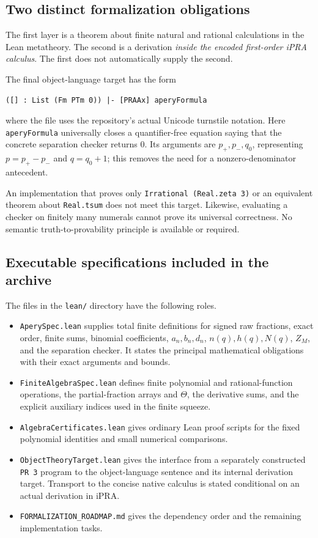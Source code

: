 \documentclass[11pt]{article}
\theoremstyle{definition}\newtheorem{definition}[theorem]{Definition}
\theoremstyle{remark}\newtheorem{remark}[theorem]{Remark}
\newcommand{\code}[1]{{\small\texttt{#1}}}
\begin{document}
\subsection{Two distinct formalization obligations}
The first layer is a theorem about finite natural and rational calculations
in the Lean metatheory. The second is a derivation \emph{inside the encoded
first-order iPRA calculus}. The first does not automatically supply the
second.

The final object-language target has the form
\begin{lstlisting}
([] : List (Fm PTm 0)) |- [PRAAx] aperyFormula
\end{lstlisting}
where the file uses the repository's actual Unicode turnstile notation.
Here \code{aperyFormula} universally closes a quantifier-free equation saying
that the concrete separation checker returns $0$. Its arguments are
$p_+,p_-,q_0$, representing $p=p_+-p_-$ and $q=q_0+1$; this removes the need
for a nonzero-denominator antecedent.

An implementation that proves only \code{Irrational (Real.zeta 3)} or an
equivalent theorem about \code{Real.tsum} does not meet this target.
Likewise, evaluating a checker on finitely many numerals cannot prove its
universal correctness. No semantic truth-to-provability principle is
available or required.

\subsection{Executable specifications included in the archive}
The files in the \code{lean/} directory have the following roles.
\begin{itemize}
\item \code{AperySpec.lean} supplies total finite definitions for signed raw
fractions, exact order, finite sums, binomial coefficients, $a_n,b_n,d_n$,
$n(q),h(q),N(q)$, $Z_M$, and the separation checker. It states the principal
mathematical obligations with their exact arguments and bounds.
\item \code{FiniteAlgebraSpec.lean} defines finite polynomial and rational-function
operations, the partial-fraction arrays and $\Theta$, the derivative sums,
and the explicit auxiliary indices used in the finite squeeze.
\item \code{AlgebraCertificates.lean} gives ordinary Lean proof scripts for
the fixed polynomial identities and small numerical comparisons.
\item \code{ObjectTheoryTarget.lean} gives the interface from a separately
constructed \code{PR 3} program to the object-language sentence and its
internal derivation target. Transport to the concise native calculus is
stated conditional on an actual derivation in iPRA.
\item \code{FORMALIZATION\_ROADMAP.md} gives the dependency order and the
remaining implementation tasks.
\end{itemize}
\end{document}
